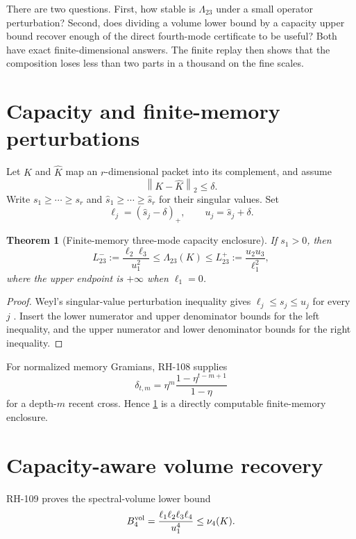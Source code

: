 \documentclass[11pt]{article}
\newtheorem{theorem}{Theorem}[section]
\theoremstyle{remark}\newtheorem{remark}[theorem]{Remark}
\newcommand{\norm}[1]{\left\lVert#1\right\rVert}
\begin{document}
There are two questions.  First, how stable is $\Lambda_{23}$ under a small
operator perturbation?  Second, does dividing a volume lower bound by a
capacity upper bound recover enough of the direct fourth-mode certificate to
be useful?  Both have exact finite-dimensional answers.  The finite replay
then shows that the composition loses less than two parts in a thousand on
the fine scales.

\section{Capacity and finite-memory perturbations}
Let $K$ and $\widehat K$ map an $r$-dimensional packet into its complement,
and assume
\begin{equation}
 \norm{K-\widehat K}_2\le\delta.
 \label{eq:radius}
\end{equation}
Write $s_1\ge\cdots\ge s_r$ and
$\widehat s_1\ge\cdots\ge\widehat s_r$ for their singular values.  Set
\begin{equation}
 \ell_j=(\widehat s_j-\delta)_+,
 \qquad u_j=\widehat s_j+\delta.
 \label{eq:endpoints}
\end{equation}

\begin{theorem}[Finite-memory three-mode capacity enclosure]
\label{thm:capacity}
If $s_1>0$, then
\begin{equation}
 L_{23}^-:=\frac{\ell_2\ell_3}{u_1^2}
 \le \Lambda_{23}(K)
 \le L_{23}^+:=\frac{u_2u_3}{\ell_1^2},
 \label{eq:capacity-interval}
\end{equation}
where the upper endpoint is $+\infty$ when $\ell_1=0$.
\end{theorem}
\begin{proof}
Weyl's singular-value perturbation inequality gives
$\ell_j\le s_j\le u_j$ for every $j$
\citep{Bhatia1997,StewartSun1990}.  Insert the lower numerator and upper
denominator bounds for the left inequality, and the upper numerator and
lower denominator bounds for the right inequality.
\end{proof}

For normalized memory Gramians, RH-108 supplies
\[
 \delta_{t,m}=\eta^m\frac{1-\eta^{t-m+1}}{1-\eta}
\]
for a depth-$m$ recent cross.  Hence \cref{thm:capacity} is a directly
computable finite-memory enclosure.

\section{Capacity-aware volume recovery}
RH-109 proves the spectral-volume lower bound
\begin{equation}
 B_4^{\rm vol}=\frac{\ell_1\ell_2\ell_3\ell_4}{u_1^4}
 \le\nu_4(K).
 \label{eq:volume}
\end{equation}
\end{document}
